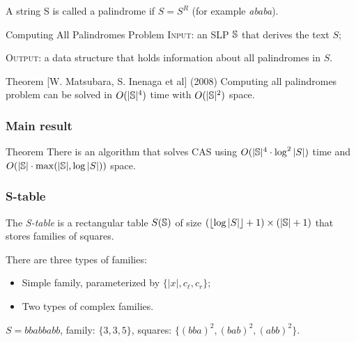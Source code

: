 \documentclass{beamer}
\begin{document}
\begin{frame}
\begin{definition}
A string S is called a palindrome if $S = S^R$ (for example \emph{ababa}).
\end{definition}

\pause

\begin{block}{Computing All Palindromes Problem}
\textsc{Input:} an SLP $\mathbb{S}$ that derives the text $S$;

\textsc{Output:} a data structure that holds information about all palindromes in $S$.
\end{block}

\pause

\begin{block}{Theorem [W. Matsubara, S. Inenaga et al] (2008)}
Computing all palindromes problem can be solved in $O(|\mathbb{S}|^4)$ time with $O(|\mathbb{S}|^2)$ space.
\end{block}

\end{frame}

\begin{frame}
\frametitle{Main result}

\begin{block}{Theorem}
There is an algorithm that solves CAS using $O(|\mathbb{S}|^4 \cdot \log^2{|S|})$ time and $O(|\mathbb{S}| \cdot \max(|\mathbb{S}|, \log{|S|}))$ space.
\end{block}

\end{frame}

\begin{frame}
\frametitle{S-table}

\begin{block}{}
The \emph{S-table} is a rectangular table $S(\mathbb{S})$ of size $(\lfloor\log |S|\rfloor+1) \times
(|\mathbb{S}|+1)$ that stores families of squares. 

\pause

There are three types of families: 
\begin{itemize}
  \item Simple family, parameterized by $\{|x|, c_\ell, c_r\}$;
  \pause
  \item Two types of complex families.
\end{itemize}
\end{block}

\pause 

\begin{example}
$S = bbabbabb$, family: $\{3, 3, 5\}$, squares: $\{(bba)^2, (bab)^2, (abb)^2 \}$.
\end{example}

\end{frame}
\end{document}
